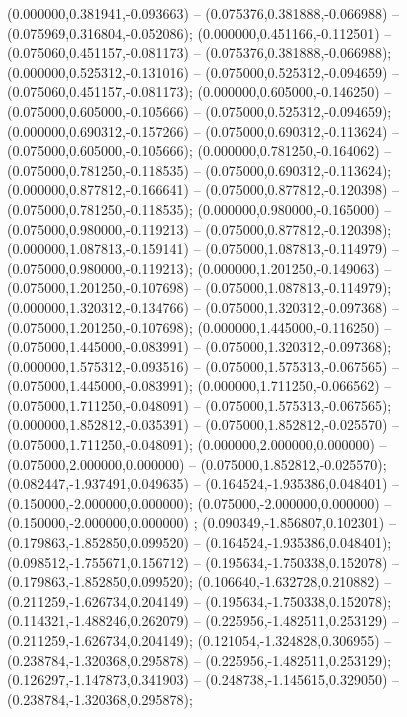  (0.000000,0.381941,-0.093663) -- (0.075376,0.381888,-0.066988) -- (0.075969,0.316804,-0.052086);
 (0.000000,0.451166,-0.112501) -- (0.075060,0.451157,-0.081173) -- (0.075376,0.381888,-0.066988);
 (0.000000,0.525312,-0.131016) -- (0.075000,0.525312,-0.094659) -- (0.075060,0.451157,-0.081173);
 (0.000000,0.605000,-0.146250) -- (0.075000,0.605000,-0.105666) -- (0.075000,0.525312,-0.094659);
 (0.000000,0.690312,-0.157266) -- (0.075000,0.690312,-0.113624) -- (0.075000,0.605000,-0.105666);
 (0.000000,0.781250,-0.164062) -- (0.075000,0.781250,-0.118535) -- (0.075000,0.690312,-0.113624);
 (0.000000,0.877812,-0.166641) -- (0.075000,0.877812,-0.120398) -- (0.075000,0.781250,-0.118535);
 (0.000000,0.980000,-0.165000) -- (0.075000,0.980000,-0.119213) -- (0.075000,0.877812,-0.120398);
 (0.000000,1.087813,-0.159141) -- (0.075000,1.087813,-0.114979) -- (0.075000,0.980000,-0.119213);
 (0.000000,1.201250,-0.149063) -- (0.075000,1.201250,-0.107698) -- (0.075000,1.087813,-0.114979);
 (0.000000,1.320312,-0.134766) -- (0.075000,1.320312,-0.097368) -- (0.075000,1.201250,-0.107698);
 (0.000000,1.445000,-0.116250) -- (0.075000,1.445000,-0.083991) -- (0.075000,1.320312,-0.097368);
 (0.000000,1.575312,-0.093516) -- (0.075000,1.575313,-0.067565) -- (0.075000,1.445000,-0.083991);
 (0.000000,1.711250,-0.066562) -- (0.075000,1.711250,-0.048091) -- (0.075000,1.575313,-0.067565);
 (0.000000,1.852812,-0.035391) -- (0.075000,1.852812,-0.025570) -- (0.075000,1.711250,-0.048091);
 (0.000000,2.000000,0.000000) -- (0.075000,2.000000,0.000000) -- (0.075000,1.852812,-0.025570);
 (0.082447,-1.937491,0.049635) -- (0.164524,-1.935386,0.048401) -- (0.150000,-2.000000,0.000000);
 (0.075000,-2.000000,0.000000) -- (0.150000,-2.000000,0.000000) ;
 (0.090349,-1.856807,0.102301) -- (0.179863,-1.852850,0.099520) -- (0.164524,-1.935386,0.048401);
 (0.098512,-1.755671,0.156712) -- (0.195634,-1.750338,0.152078) -- (0.179863,-1.852850,0.099520);
 (0.106640,-1.632728,0.210882) -- (0.211259,-1.626734,0.204149) -- (0.195634,-1.750338,0.152078);
 (0.114321,-1.488246,0.262079) -- (0.225956,-1.482511,0.253129) -- (0.211259,-1.626734,0.204149);
 (0.121054,-1.324828,0.306955) -- (0.238784,-1.320368,0.295878) -- (0.225956,-1.482511,0.253129);
 (0.126297,-1.147873,0.341903) -- (0.248738,-1.145615,0.329050) -- (0.238784,-1.320368,0.295878);
